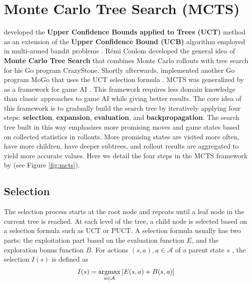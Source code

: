 \section{Monte Carlo Tree Search (MCTS)} \label{sec:mcts}

\citeauthor{BanditBasedMonteCarlo_Kocsis.Szepesvari_2006} developed the \textbf{Upper Confidence Bounds applied to Trees (UCT)} method as an extension of the \textbf{Upper Confidence Bound (UCB)} algorithm employed in multi-armed bandit problems \cite{BanditBasedMonteCarlo_Kocsis.Szepesvari_2006}.
Rémi Coulom developed the general idea of \textbf{Monte Carlo Tree Search} that combines Monte Carlo rollouts with tree search \cite{EfficientSelectivityBackup_Coulom_2007} for his Go program CrazyStone.
Shortly afterwards,
\citeauthor{ModificationUCTPatterns_Gelly.Wang.ea_2006} implemented another Go program MoGo that uses the UCT selection formula \cite{ModificationUCTPatterns_Gelly.Wang.ea_2006}.
MCTS was generalized by \citeauthor{MonteCarloTreeSearch_Chaslot.Bakkes.ea_2008} as a framework for game AI \cite{MonteCarloTreeSearch_Chaslot.Bakkes.ea_2008}.
This framework requires less domain knowledge than classic approaches to game AI while giving better results.
The core idea of this framework is to gradually build the search tree by iteratively applying four steps: \textbf{selection}, \textbf{expansion}, \textbf{evaluation}, and \textbf{backpropagation}.
The search tree built in this way emphasizes more promising moves and game states based on collected statistics in rollouts.
More promising states are visited more often, have more children, have deeper subtrees, and rollout results are aggregated to yield more accurate values. Here we detail the four steps in the MCTS framework by \citeauthor{MonteCarloTreeSearch_Chaslot.Bakkes.ea_2008} (see Figure \ref{fig:mcts}).


\subsection{Selection}
The selection process starts at the root node and repeats until a leaf node in the current tree is reached.
At each level of the tree, a child node is selected based on a selection formula such as UCT or PUCT.
A selection formula usually has two parts: the exploitation part based on the evaluation function $E$, and the exploration bonus function $B$.
For actions $(s, a), a \in \mathcal{A}$ of a parent state $s$ , the selection $I(s)$ is defined as
\begin{align}
    I(s) = \operatorname*{argmax}_{a \in \mathcal{A}}{\left[ E(s, a) + B(s, a) \right]}
    \label{eq:mcts_selection}
\end{align}

